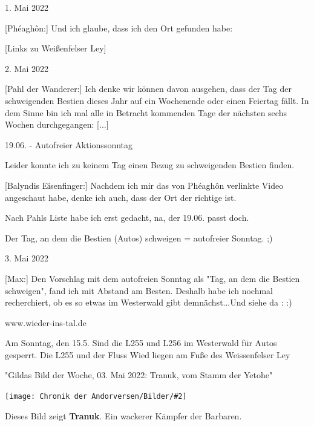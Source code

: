 \documentclass[10pt, a4paper, oneside]{book}
\newcommand{\bildmitts}[2][height=0.32\textwidth,width=0.48\textwidth,keepaspectratio]{%
    \begin{center}
        \texttt{[image: Chronik der Andorversen/Bilder/\#2]}
    \end{center}
}
\begin{document}
\begin{multicols}{2}

\begin{center}
    1. Mai 2022
\end{center}

[Phéaghôn:] Und ich glaube, dass ich den Ort gefunden habe:

[Links zu Weißenfelser Ley]

\begin{center}
    2. Mai 2022
\end{center}

[Pahl der Wanderer:] Ich denke wir können davon ausgehen, dass der Tag der schweigenden Bestien dieses Jahr auf ein Wochenende oder einen Feiertag fällt. In dem Sinne bin ich mal alle in Betracht kommenden Tage der nächsten sechs Wochen durchgegangen: [...]

19.06. - Autofreier Aktionssonntag

Leider konnte ich zu keinem Tag einen Bezug zu schweigenden Bestien finden.

[Balyndis Eisenfinger:] Nachdem ich mir das von Phéaghôn verlinkte Video angeschaut habe, denke ich auch, dass der Ort der richtige ist.

Nach Pahls Liste habe ich erst gedacht, na, der 19.06. passt doch.

Der Tag, an dem die Bestien (Autos) schweigen = autofreier Sonntag. ;)

\begin{center}
    3. Mai 2022
\end{center}

[Max:] Den Vorschlag mit dem autofreien Sonntag als "Tag, an dem die Bestien schweigen", fand ich mit Abstand am Besten. Deshalb habe ich nochmal recherchiert, ob es so etwas im Westerwald gibt demnächst...Und siehe da : :)

www.wieder-ins-tal.de

Am Sonntag, den 15.5. Sind die L255 und L256 im Westerwald für Autos gesperrt. Die L255 und der Fluss Wied liegen am Fuße des Weissenfelser Ley



\begin{center}
    "Gildas Bild der Woche, 03. Mai 2022: Tranuk, vom Stamm der Yetohe"
\end{center}

\bildmitts{AA2022 Tranuk.jpeg}

Dieses Bild zeigt \textbf{Tranuk}. Ein wackerer Kämpfer der Barbaren.


\end{multicols}
\end{document}
